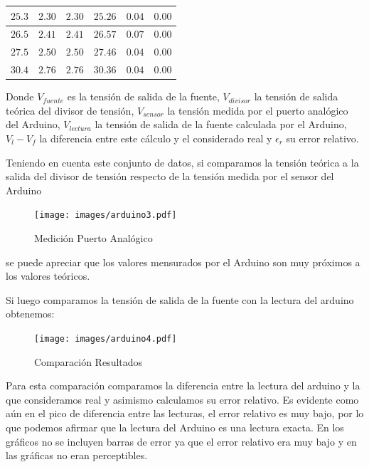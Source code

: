 \documentclass[12pt,a4paper]{article}
\begin{document}
\begin{center}
{\begin{tabular}{ |l|l|l|l|l|l| }
				$ 25.3  $ & $2.30$ & $2.30$ & $25.26 $ & $ 0.04  $  & $  0.00 $\\ \hline                                                                 
				$ 26.5  $ & $2.41$ & $2.41$ & $26.57 $ & $ 0.07  $  & $  0.00 $\\ \hline                                                                   
				$ 27.5  $ & $2.50$ & $2.50$ & $27.46 $ & $ 0.04  $  & $  0.00 $\\ \hline                                                                
				$ 30.4  $ & $2.76$ & $2.76$ & $30.36 $ & $ 0.04  $  & $  0.00 $\\ \hline                                                                  

 				
				
			\end{tabular}}\label{tab:medarduino}
			\end{center}

			Donde $V_{fuente}$ es la tensión de salida de la fuente, $V_{divisor}$ la tensión de salida teórica del divisor de tensión, $V_{sensor}$ la tensión medida por el puerto analógico del Arduino, $V_{lectura}$ la tensión de salida de la fuente calculada por el Arduino, $V_l - V_f$ la diferencia entre este cálculo y el considerado real y $\epsilon _r$ su error relativo.

			Teniendo en cuenta este conjunto de datos, si comparamos la tensión teórica a la salida del divisor de tensión respecto de la tensión medida por el sensor del Arduino

			\begin{figure}[H]
			\centering
				\texttt{[image: images/arduino3.pdf]}\caption{Medición Puerto Analógico}
			\end{figure}
			se puede apreciar que los valores mensurados por el Arduino son muy próximos a los valores teóricos.

			Si luego comparamos la tensión de salida de la fuente con la lectura del arduino obtenemos:

			\begin{figure}[H]
			\centering
				\texttt{[image: images/arduino4.pdf]}\caption{Comparación Resultados}
			\end{figure}

			Para esta comparación comparamos la diferencia entre la lectura del arduino y la que consideramos real y asimismo calculamos su error relativo. Es evidente como aún en el pico de diferencia entre las lecturas, el error relativo es muy bajo, por lo que podemos afirmar que la lectura del Arduino es una lectura exacta. En los gráficos no se incluyen barras de error ya que el error relativo era muy bajo y en las gráficas no eran perceptibles.
\end{document}

